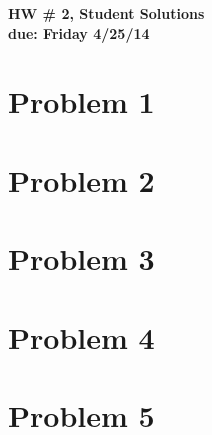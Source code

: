 \documentclass[12pt]{exam}
\begin{document}
\pagestyle{headandfoot} 
       {\bf \flushright HW \# 2, Student Solutions \\}
       {\bf \flushright due: Friday 4/25/14}
\headrule \footrule

\section*{Problem 1}
%
%
\section*{Problem 2}
%
%
\section*{Problem 3}

%
%
\section*{Problem 4}
%
%
\section*{Problem 5}
%
%
\end{document}
